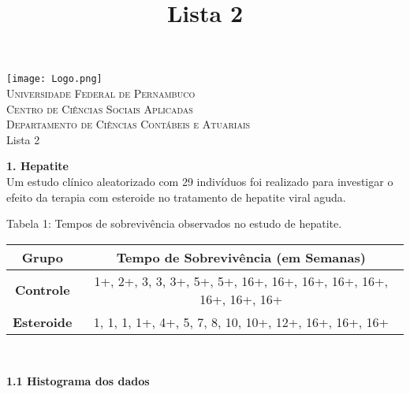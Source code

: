 \documentclass[12pt,a4paper]{article}
\title{Lista 2}
\date{}
\begin{document}
	\begin{center}
		\texttt{[image: Logo.png]}\\
		\textsc{Universidade Federal de Pernambuco\\
			Centro de Ciências Sociais Aplicadas\\
			Departamento de Ciências Contábeis e Atuariais\\}
		\vspace{5cm}
		\huge Lista 2\\ \normalsize
		\vspace{4cm}
	\end{center}
	\newpage
	\textbf{1. Hepatite}
	\vspace{0.5cm}\\
	Um estudo clínico aleatorizado com 29 indivíduos foi realizado para investigar o efeito da terapia com esteroide no tratamento de hepatite viral aguda.
	\begin{center}
		\small{Tabela 1: Tempos de sobrevivência observados no estudo de hepatite.}\\
		\begin{tabular}{|c|c|}\hline
			\textbf{Grupo} & \textbf{Tempo de Sobrevivência (em Semanas)}\\ \hline
			\textbf{Controle} & 1+, 2+, 3, 3, 3+, 5+, 5+, 16+, 16+, 16+, 16+, 16+, 16+, 16+, 16+\\ \hline
			\textbf{Esteroide} & 1, 1, 1, 1+, 4+, 5, 7, 8, 10, 10+, 12+, 16+, 16+, 16+\\ \hline
		\end{tabular}
		\vspace{1cm}\\
	\end{center}
	\textbf{1.1 Histograma dos dados}
\end{document}
